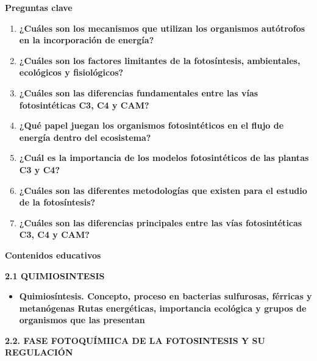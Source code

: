 \documentclass[
]{article}
\providecommand{\tightlist}{%
  \setlength{\itemsep}{0pt}\setlength{\parskip}{0pt}}
\begin{document}
\textbf{Preguntas clave}

\begin{enumerate}
\def\labelenumi{\arabic{enumi}.}
\item
  \textbf{¿Cuáles son los mecanismos que utilizan los organismos
  autótrofos en la incorporación de energía?}
\item
  \textbf{¿Cuáles son los factores limitantes de la fotosíntesis,
  ambientales, ecológicos y fisiológicos?}
\item
  \textbf{¿Cuáles son las diferencias fundamentales entre las vías
  fotosintéticas C3, C4 y CAM?}
\item
  \textbf{¿Qué papel juegan los organismos fotosintéticos en el flujo de
  energía dentro del ecosistema?}
\item
  \textbf{¿Cuál es la importancia de los modelos fotosintéticos de las
  plantas C3 y C4?}
\item
  \textbf{¿Cuáles son las diferentes metodologías que existen para el
  estudio de la fotosíntesis?}
\item
  \textbf{¿Cuáles son las diferencias principales entre las vías
  fotosintéticas C3, C4 y CAM?}
\end{enumerate}

\textbf{Contenidos educativos}

\textbf{2.1 QUIMIOSINTESIS}

\begin{itemize}
\tightlist
\item
  \textbf{Quimiosíntesis. Concepto, proceso en bacterias sulfurosas,
  férricas y metanógenas Rutas energéticas, importancia ecológica y
  grupos de organismos que las presentan}
\end{itemize}

\textbf{2.2. FASE FOTOQUÍMIICA DE LA FOTOSINTESIS Y SU REGULACIÓN}
\end{document}
